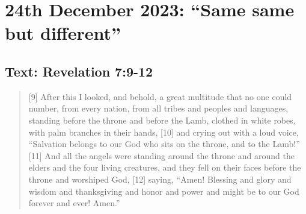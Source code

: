 \setcounter{figure}{0}

\section{24th December 2023: ``Same same but different''}
\subsection*{Text: Revelation 7:9-12}
  \begin{quote}
    [9] After this I looked, and behold, a great multitude that no one could number, from every nation, from all tribes and peoples and languages, standing before the throne and before the Lamb, clothed in white robes, with palm branches in their hands, [10] and crying out with a loud voice, “Salvation belongs to our God who sits on the throne, and to the Lamb!” [11] And all the angels were standing around the throne and around the elders and the four living creatures, and they fell on their faces before the throne and worshiped God, [12] saying, “Amen! Blessing and glory and wisdom and thanksgiving and honor and power and might be to our God forever and ever! Amen.”
  \end{quote}
